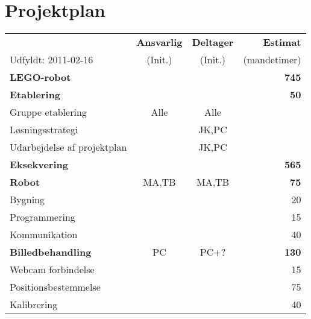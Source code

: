 \section{Projektplan}
\begin{center}
\begin{tabular}{l c c r}
								& \textbf{Ansvarlig} & \textbf{Deltager} & \textbf{Estimat} \\
	Udfyldt: 2011-02-16			& (Init.)	& (Init.)	& (mandetimer) \\
	\hline
	\textbf{LEGO-robot}			&			&			& \textbf{745} \\
	\hline
	\textbf{Etablering}			& 			& 			& \textbf{50}\\
	\hspace*{0.3cm} Gruppe etablering & Alle & Alle & \\
	\hspace*{0.3cm} Løsningsstrategi & & JK,PC & \\
	\hspace*{0.3cm} Udarbejdelse af projektplan & & JK,PC & \\
	\hline
	\textbf{Eksekvering}		&			&			& \textbf{565} \\
	\hspace*{0.3cm} \textbf{Robot}										& MA,TB & MA,TB	& \textbf{75}\\
	\hspace*{0.3cm}\hspace*{0.3cm} Bygning						& 		&		& 20\\
	\hspace*{0.3cm}\hspace*{0.3cm} Programmering				&		&		& 15\\
	\hspace*{0.3cm}\hspace*{0.3cm} Kommunikation				&		&		& 40\\
	\hspace*{0.3cm} \textbf{Billedbehandling}							& PC	& PC+?	& \textbf{130}\\
	\hspace*{0.3cm}\hspace*{0.3cm} Webcam forbindelse			&		&		& 15\\
	\hspace*{0.3cm}\hspace*{0.3cm} Positionsbestemmelse			&		&		& 75\\
	\hspace*{0.3cm}\hspace*{0.3cm} Kalibrering					&		&		& 40\\

\end{tabular}
\end{center}
